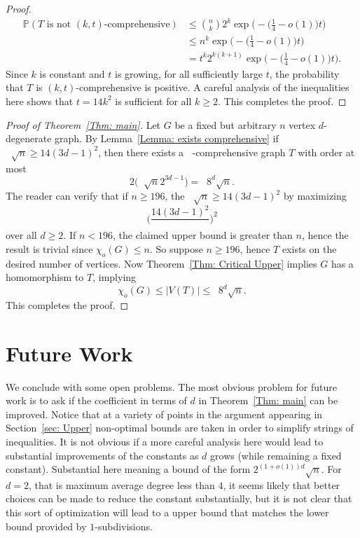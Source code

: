 \documentclass[11pt]{article}
\theoremstyle{definition}
\DeclareMathOperator{\coe}{6\Big(1+\frac{9d^2}{4}\Big)^{\frac{1}{2}}d}
\DeclareMathOperator{\bound}{\Big( 3d-1, \coe\sqrt{n}\Big)}
\begin{document}
\begin{proof}
    \begin{align*}
        \mathbb{P}(\text{$T$ is not $(k,t)$-comprehensive}) & \leq \binom{n}{k}2^k\exp\Big( -\Big(\frac{1}{4} - o(1)\Big)t \Big) \\
        & \leq n^k \exp\Big( -\Big(\frac{1}{4} - o(1)\Big)t \Big) \\
        & = t^k 2^{k(k+1)}\exp\Big( -\Big(\frac{1}{4} - o(1)\Big)t \Big).
    \end{align*}
    Since $k$ is constant and $t$ is growing, for all sufficiently large $t$, the probability that $T$ is 
    $(k,t)$-comprehensive is positive.
    A careful analysis of the inequalities here shows that $t = 14k^2$ is sufficient for all $k\geq 2$.
    This completes the proof.
\end{proof}

\begin{proof}[Proof of Theorem~\ref{Thm: main}]
    Let $G$ be a fixed but arbitrary $n$ vertex $d$-degenerate graph.
    By Lemma~\ref{Lemma: exists comprehensive} 
    if $\coe \sqrt{n} \geq 14(3d-1)^2$, then
    there exists a $\bound$-comprehensive
    graph $T$ with order at most 
    \[
    2\Bigg( \coe \sqrt{n} 2^{3d-1}\Bigg) = \coe8^{d}\sqrt{n}.
    \]
    The reader can verify that if $n\geq 196$, the
    $\coe \sqrt{n} \geq 14(3d-1)^2$
    by maximizing 
    \[
    \Bigg(\frac{14(3d-1)^2}{\coe }\Bigg)^2
    \] 
    over all $d\geq 2$.
    If $n< 196$, the claimed upper bound is greater than $n$,
    hence the result is trivial since $\chi_o(G) \leq n$.
    So suppose $n\geq 196$, hence $T$ exists on the desired number of vertices.
    Now Theorem~\ref{Thm: Critical Upper} implies $G$ has a homomorphism to $T$,
    implying
    \[
    \chi_o(G) \leq |V(T)|\leq \coe8^{d}\sqrt{n}.
    \]
    This completes the proof.
\end{proof}


\section{Future Work}
\label{sec: future}



We conclude with some open problems.
The most obvious problem for future work is to ask if the coefficient in terms of $d$
in Theorem~\ref{Thm: main} can be improved.
Notice that at a variety of points in the argument appearing in Section~\ref{sec: Upper}
non-optimal bounds are taken in order to simplify strings of inequalities.
It is not obvious if a more careful analysis here would lead to substantial improvements 
of the constants as $d$ grows (while remaining a fixed constant).
Substantial here meaning a bound of the form $2^{(1+o(1))d}\sqrt{n}$.
For $d=2$, that is maximum average degree less than $4$, it seems likely that better choices can be made to reduce the constant substantially,
but it is not clear that this sort of optimization will
lead to a upper bound that matches the lower bound provided by $1$-subdivisions.
\end{document}

